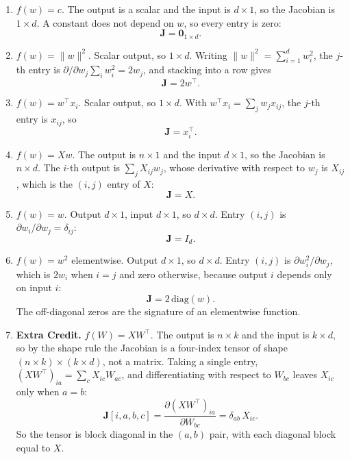 \documentclass[11pt]{article}
\begin{document}
\begin{enumerate}
  \item $f(w) = c$. The output is a scalar and the input is $d \times 1$, so the Jacobian is
        $1 \times d$. A constant does not depend on $w$, so every entry is zero:
        \[ \mathbf{J} = \mathbf{0}_{1 \times d}. \]

  \item $f(w) = \|w\|^2$. Scalar output, so $1 \times d$. Writing
        $\|w\|^2 = \sum_{i=1}^{d} w_i^2$, the $j$-th entry is
        $\partial/\partial w_j \sum_i w_i^2 = 2w_j$, and stacking into a row gives
        \[ \mathbf{J} = 2w^\top. \]

  \item $f(w) = w^\top x_i$. Scalar output, so $1 \times d$. With
        $w^\top x_i = \sum_{j} w_j x_{ij}$, the $j$-th entry is $x_{ij}$, so
        \[ \mathbf{J} = x_i^\top. \]

  \item $f(w) = Xw$. The output is $n \times 1$ and the input $d \times 1$, so the Jacobian is
        $n \times d$. The $i$-th output is $\sum_{j} X_{ij} w_j$, whose derivative with respect to
        $w_j$ is $X_{ij}$, which is the $(i,j)$ entry of $X$:
        \[ \mathbf{J} = X. \]

  \item $f(w) = w$. Output $d \times 1$, input $d \times 1$, so $d \times d$. Entry $(i,j)$ is
        $\partial w_i/\partial w_j = \delta_{ij}$:
        \[ \mathbf{J} = I_d. \]

  \item $f(w) = w^2$ elementwise. Output $d \times 1$, so $d \times d$. Entry $(i,j)$ is
        $\partial w_i^2/\partial w_j$, which is $2w_i$ when $i = j$ and zero otherwise, because output $i$
        depends only on input $i$:
        \[ \mathbf{J} = 2\,\mathrm{diag}(w). \]
        The off-diagonal zeros are the signature of an elementwise function.

  \item \textbf{Extra Credit.} $f(W) = XW^\top$. The output is $n \times k$ and the input is
        $k \times d$, so by the shape rule the Jacobian is a four-index tensor of shape
        $(n \times k) \times (k \times d)$, not a matrix. Taking a single entry,
        $(XW^\top)_{ia} = \sum_{c} X_{ic} W_{ac}$, and differentiating with respect to $W_{bc}$ leaves
        $X_{ic}$ only when $a = b$:
        \[ \mathbf{J}[i,a,b,c] = \frac{\partial (XW^\top)_{ia}}{\partial W_{bc}} = \delta_{ab}\, X_{ic}. \]
        So the tensor is block diagonal in the $(a,b)$ pair, with each diagonal block equal to $X$.
\end{enumerate}
\end{document}
